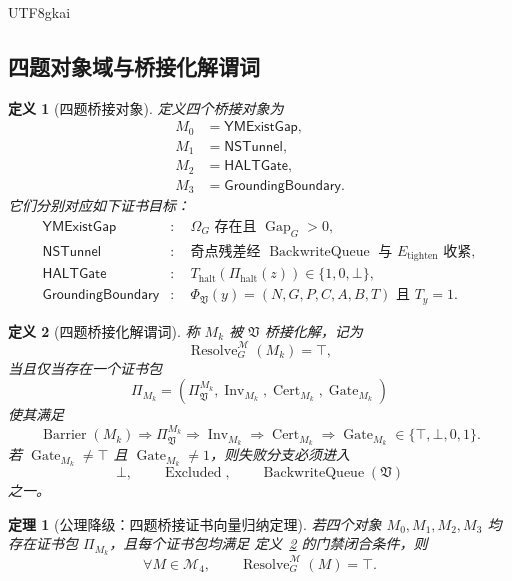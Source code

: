 \documentclass[12pt]{article}
\newtheorem{definition}{定义}[section]
\newtheorem{theorem}{定理}[section]
\newcommand{\Vsys}{\mathfrak V}
\newcommand{\CertTuple}{(N,G,P,C,A,B,T)}
\DeclareMathOperator{\Cert}{Cert}
\DeclareMathOperator{\Resolve}{Resolve}
\DeclareMathOperator{\Barrier}{Barrier}
\DeclareMathOperator{\Gate}{Gate}
\DeclareMathOperator{\Inv}{Inv}
\DeclareMathOperator{\BackwriteQueue}{BackwriteQueue}
\DeclareMathOperator{\Excluded}{Excluded}
\DeclareMathOperator{\Gap}{Gap}
\begin{document}
\begin{CJK*}{UTF8}{gkai}
\subsection{四题对象域与桥接化解谓词}
\label{subsec:tex59-m4-objects}

\begin{definition}[四题桥接对象]
\label{def:tex59-m4-objects}
定义四个桥接对象为
\[
\begin{aligned}
  M_0&=\mathsf{YMExistGap},\\
  M_1&=\mathsf{NSTunnel},\\
  M_2&=\mathsf{HALTGate},\\
  M_3&=\mathsf{GroundingBoundary}.
\end{aligned}
\]
它们分别对应如下证书目标：
\[
\begin{aligned}
  \mathsf{YMExistGap}
  &: \quad \Omega_G\text{ 存在且 }\Gap_G>0,\\
  \mathsf{NSTunnel}
  &: \quad \text{奇点残差经 }\BackwriteQueue\text{ 与 }E_{\mathrm{tighten}}\text{ 收紧},\\
  \mathsf{HALTGate}
  &: \quad T_{\mathrm{halt}}(\Pi_{\mathrm{halt}}(z))\in\{1,0,\bot\},\\
  \mathsf{GroundingBoundary}
  &: \quad \Phi_{\Vsys}(y)=\CertTuple\text{ 且 }T_y=1.
\end{aligned}
\]
\end{definition}

\begin{definition}[四题桥接化解谓词]
\label{def:tex59-m4-resolution}
称 \(M_k\) 被 \(\Vsys\) 桥接化解，记为
\[
  \Resolve_G^{\mathcal M}(M_k)=\top,
\]
当且仅当存在一个证书包
\[
  \Pi_{M_k}
  =
  \left(
    \Pi_{\Vsys}^{M_k},
    \Inv_{M_k},
    \Cert_{M_k},
    \Gate_{M_k}
  \right)
\]
使其满足
\[
  \Barrier(M_k)
  \Longrightarrow
  \Pi_{\Vsys}^{M_k}
  \Longrightarrow
  \Inv_{M_k}
  \Longrightarrow
  \Cert_{M_k}
  \Longrightarrow
  \Gate_{M_k}\in\{\top,\bot,0,1\}.
\]
若 \(\Gate_{M_k}\ne\top\) 且 \(\Gate_{M_k}\ne1\)，则失败分支必须进入
\[
  \bot,\qquad \Excluded,\qquad \BackwriteQueue(\Vsys)
\]
之一。
\end{definition}

\begin{theorem}[公理降级：四题桥接证书向量归纳定理]
\label{thm:tex59-m4-induction}
若四个对象 \(M_0,M_1,M_2,M_3\) 均存在证书包 \(\Pi_{M_k}\)，且每个证书包均满足
定义~\ref{def:tex59-m4-resolution} 的门禁闭合条件，则
\[
  \forall M\in\mathcal M_4,\qquad
  \Resolve_G^{\mathcal M}(M)=\top.
\]
\end{theorem}


\end{CJK*}
\end{document}
